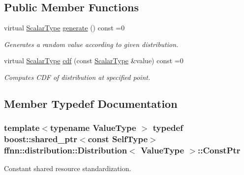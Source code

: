 \subsection*{Public Member Functions}
\begin{DoxyCompactItemize}
\item 
virtual \hyperlink{classffnn_1_1distribution_1_1_distribution_ad62797f0dcb4bb4698bdf17e3f3b07bb}{Scalar\-Type} \hyperlink{classffnn_1_1distribution_1_1_distribution_a150f344a8fe585fdebd462a4a07ec0ed}{generate} () const =0
\begin{DoxyCompactList}\small\item\em Generates a random value according to given distribution. \end{DoxyCompactList}\item 
virtual \hyperlink{classffnn_1_1distribution_1_1_distribution_ad62797f0dcb4bb4698bdf17e3f3b07bb}{Scalar\-Type} \hyperlink{classffnn_1_1distribution_1_1_distribution_aaa3f1b954382c25a5fc50da0de37722c}{cdf} (const \hyperlink{classffnn_1_1distribution_1_1_distribution_ad62797f0dcb4bb4698bdf17e3f3b07bb}{Scalar\-Type} \&value) const =0
\begin{DoxyCompactList}\small\item\em Computes C\-D\-F of distribution at specified point. \end{DoxyCompactList}\end{DoxyCompactItemize}


\subsection{Member Typedef Documentation}
\hypertarget{classffnn_1_1distribution_1_1_distribution_a829c8056b31313f6196f5659ca9503cc}{
\subsubsection[{Const\-Ptr}]{\setlength{\rightskip}{0pt plus 5cm}template$<$typename Value\-Type $>$ typedef boost\-::shared\-\_\-ptr$<$const {\bf Self\-Type}$>$ {\bf ffnn\-::distribution\-::\-Distribution}$<$ Value\-Type $>$\-::{\bf Const\-Ptr}}}\label{classffnn_1_1distribution_1_1_distribution_a829c8056b31313f6196f5659ca9503cc}


Constant shared resource standardization. 

